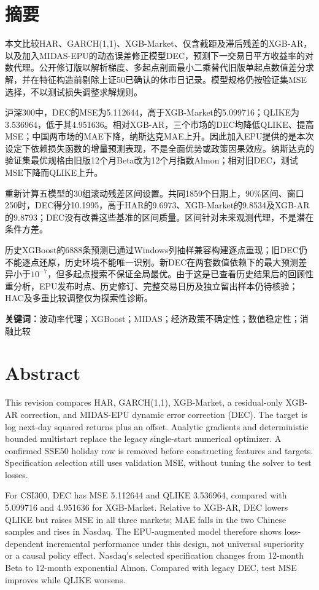 \section*{摘要}
本文比较HAR、GARCH(1,1)、XGB-Market、仅含截距及滞后残差的XGB-AR，以及加入MIDAS-EPU的动态误差修正模型DEC，预测下一交易日平方收益率的对数代理。公开修订版以解析梯度、多起点剖面最小二乘替代旧版单起点数值差分求解，并在特征构造前剔除上证50已确认的休市日记录。模型规格仍按验证集MSE选择，不以测试损失调整求解规则。

沪深300中，DEC的MSE为5.112644，高于XGB-Market的5.099716；QLIKE为3.536964，低于其4.951636。相对XGB-AR，三个市场的DEC均降低QLIKE、提高MSE；中国两市场的MAE下降，纳斯达克MAE上升。因此加入EPU提供的是本次设定下依赖损失函数的增量预测表现，不是全面优势或政策因果效应。纳斯达克的验证集最优规格由旧版12个月Beta改为12个月指数Almon；相对旧DEC，测试MSE下降而QLIKE上升。

重新计算五模型的30组滚动残差区间设置。共同1859个日期上，90\%区间、窗口250时，DEC得分10.1995，高于HAR的9.6973、XGB-Market的9.8534及XGB-AR的9.8793；DEC没有改善这些基准的区间质量。区间针对未来观测代理，不是潜在条件方差。

历史XGBoost的6888条预测已通过Windows列抽样兼容构建逐点重现；旧DEC仍不能逐点还原，历史环境不能唯一识别。新DEC在两套数值依赖下的最大预测差异小于$10^{-7}$，但多起点搜索不保证全局最优。由于这是已查看历史结果后的回顾性重分析，EPU发布时点、历史修订、完整交易日历及独立留出样本仍待核验；HAC及多重比较调整仅为探索性诊断。

\noindent\textbf{关键词：}波动率代理；XGBoost；MIDAS；经济政策不确定性；数值稳定性；消融比较
\clearpage
\section*{Abstract}
This revision compares HAR, GARCH(1,1), XGB-Market, a residual-only XGB-AR correction, and MIDAS-EPU dynamic error correction (DEC). The target is log next-day squared returns plus an offset. Analytic gradients and deterministic bounded multistart replace the legacy single-start numerical optimizer. A confirmed SSE50 holiday row is removed before constructing features and targets. Specification selection still uses validation MSE, without tuning the solver to test losses.

For CSI300, DEC has MSE 5.112644 and QLIKE 3.536964, compared with 5.099716 and 4.951636 for XGB-Market. Relative to XGB-AR, DEC lowers QLIKE but raises MSE in all three markets; MAE falls in the two Chinese samples and rises in Nasdaq. The EPU-augmented model therefore shows loss-dependent incremental performance under this design, not universal superiority or a causal policy effect. Nasdaq's selected specification changes from 12-month Beta to 12-month exponential Almon. Compared with legacy DEC, test MSE improves while QLIKE worsens.

